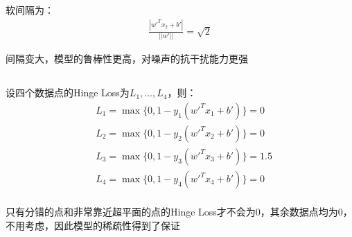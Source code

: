 \documentclass[12pt, a4paper]{article}
\begin{document}
软间隔为：
\begin{align*}
    \frac{|{w'}^T x_2+b'|}{||w'||}=\sqrt{2}
\end{align*}

间隔变大，模型的鲁棒性更高，对噪声的抗干扰能力更强


\subsection{}

设四个数据点的Hinge Loss为$L_1, \dots, L_4$，则：
\begin{align*}
    &L_1=\max\{0,1-y_1({w'}^T x_1+b')\}=0\\
    &L_2=\max\{0,1-y_2({w'}^T x_2+b')\}=0\\
    &L_3=\max\{0,1-y_3({w'}^T x_3+b')\}=1.5\\
    &L_4=\max\{0,1-y_4({w'}^T x_4+b')\}=0\\
\end{align*}

只有分错的点和非常靠近超平面的点的Hinge Loss才不会为0，其余数据点均为0，
不用考虑，因此模型的稀疏性得到了保证
\end{document}
